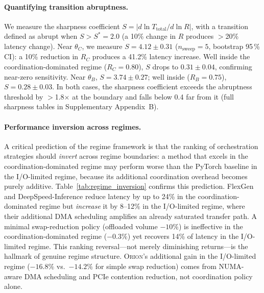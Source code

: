 \paragraph{Quantifying transition abruptness.}
We measure the sharpness coefficient
$S = |d\ln T_{\mathrm{total}}/d\ln R|$, with a transition defined as abrupt
when $S > S^{*} = 2.0$ (a 10\% change in $R$ produces $>$20\% latency change).
Near $\theta_C$, we measure $S = 4.12 \pm 0.31$
($n_{\mathrm{sweep}} = 5$, bootstrap 95\,\% CI): a 10\% reduction in
$R_C$ produces a 41.2\% latency increase.
Well inside the coordination-dominated regime ($R_C = 0.80$), $S$ drops to
$0.31 \pm 0.04$, confirming near-zero sensitivity.
Near $\theta_B$, $S = 3.74 \pm 0.27$; well inside ($R_B = 0.75$),
$S = 0.28 \pm 0.03$.
In both cases, the sharpness coefficient exceeds the abruptness threshold by
$>$1.8$\times$ at the boundary and falls below 0.4 far from it (full sharpness
tables in Supplementary Appendix~B).

\paragraph{Performance inversion across regimes.}
A critical prediction of the regime framework is that the ranking of
orchestration strategies should \emph{invert} across regime boundaries: a method
that excels in the coordination-dominated regime may perform worse than the
PyTorch baseline in the I/O-limited regime, because its additional coordination
overhead becomes purely additive.
Table~\ref{tab:regime_inversion} confirms this prediction.
FlexGen and DeepSpeed-Inference reduce latency by up to 24\% in the
coordination-dominated regime but \emph{increase} it by 8--12\% in the
I/O-limited regime, where their additional DMA scheduling amplifies an already
saturated transfer path.
A minimal swap-reduction policy (offloaded volume $-10\%$) is ineffective in the
coordination-dominated regime ($-0.3\%$) yet recovers 14\% of latency in the
I/O-limited regime.
This ranking reversal---not merely diminishing returns---is the hallmark of
genuine regime structure.
\textsc{Orion}'s additional gain in the I/O-limited regime
($-16.8\%$ vs.\ $-14.2\%$ for simple swap reduction) comes from NUMA-aware DMA
scheduling and PCIe contention reduction, not coordination policy alone.


